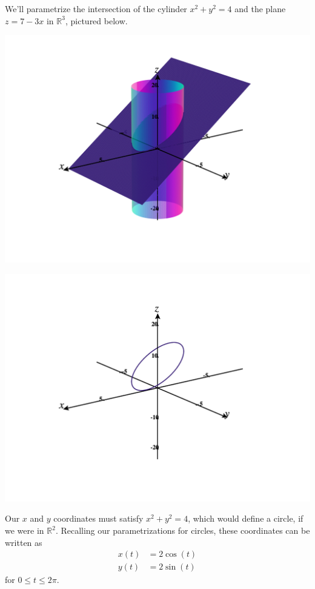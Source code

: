 \documentclass{ximera}
\begin{document}
\begin{example}
We'll parametrize the intersection of the cylinder $x^2 + y^2 = 4$ and the plane $z = 7-3x$ in $\mathbb{R}^3$, pictured below.

\begin{image}
\includegraphics[width=\textwidth]{CalcPlot3D-cyl_plane}
\end{image}

\begin{image}
\includegraphics[width=\textwidth]{CalcPlot3D-cyl_plane_curve}
\end{image}


Our $x$ and $y$ coordinates must satisfy $x^2 + y^2 = 4$, which would define a circle, if we were in $\mathbb{R}^2$. Recalling our parametrizations for circles, these coordinates can be written as
\begin{align*}
x(t) &= 2\cos(t)\\
y(t) &= 2\sin(t)
\end{align*}
for $0\leq t\leq 2\pi$.


\end{example}
\end{document}
